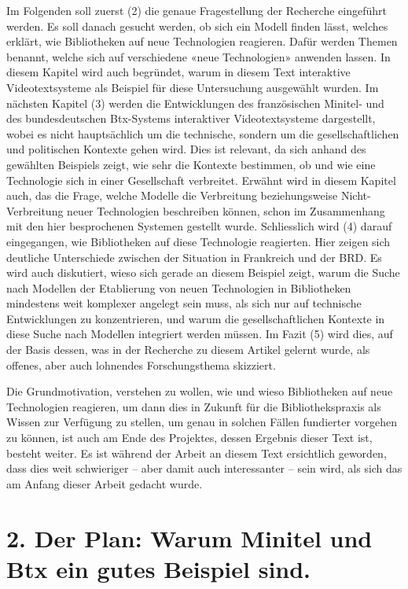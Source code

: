 \documentclass[a4paper,
fontsize=11pt,
oneside,
numbers=noperiodatend,
parskip=half-,
bibliography=totoc,
final
]{scrartcl}
\begin{document}
Im Folgenden soll zuerst (2) die genaue Fragestellung der Recherche
eingeführt werden. Es soll danach gesucht werden, ob sich ein Modell
finden lässt, welches erklärt, wie Bibliotheken auf neue Technologien
reagieren. Dafür werden Themen benannt, welche sich auf verschiedene
«neue Technologien» anwenden lassen. In diesem Kapitel wird auch
begründet, warum in diesem Text interaktive Videotextsysteme als
Beispiel für diese Untersuchung ausgewählt wurden. Im nächsten Kapitel
(3) werden die Entwicklungen des französischen Minitel- und des
bundesdeutschen Btx-Systems interaktiver Videotextsysteme dargestellt,
wobei es nicht hauptsächlich um die technische, sondern um die
gesellschaftlichen und politischen Kontexte gehen wird. Dies ist
relevant, da sich anhand des gewählten Beispiels zeigt, wie sehr die
Kontexte bestimmen, ob und wie eine Technologie sich in einer
Gesellschaft verbreitet. Erwähnt wird in diesem Kapitel auch, das die
Frage, welche Modelle die Verbreitung beziehungsweise Nicht-Verbreitung
neuer Technologien beschreiben können, schon im Zusammenhang mit den
hier besprochenen Systemen gestellt wurde. Schliesslich wird (4) darauf
eingegangen, wie Bibliotheken auf diese Technologie reagierten. Hier
zeigen sich deutliche Unterschiede zwischen der Situation in Frankreich
und der BRD. Es wird auch diskutiert, wieso sich gerade an diesem
Beispiel zeigt, warum die Suche nach Modellen der Etablierung von neuen
Technologien in Bibliotheken mindestens weit komplexer angelegt sein
muss, als sich nur auf technische Entwicklungen zu konzentrieren, und
warum die gesellschaftlichen Kontexte in diese Suche nach Modellen
integriert werden müssen. Im Fazit (5) wird dies, auf der Basis dessen,
was in der Recherche zu diesem Artikel gelernt wurde, als offenes, aber
auch lohnendes Forschungsthema skizziert.

Die Grundmotivation, verstehen zu wollen, wie und wieso Bibliotheken auf
neue Technologien reagieren, um dann dies in Zukunft für die
Bibliothekspraxis als Wissen zur Verfügung zu stellen, um genau in
solchen Fällen fundierter vorgehen zu können, ist auch am Ende des
Projektes, dessen Ergebnis dieser Text ist, besteht weiter. Es ist
während der Arbeit an diesem Text ersichtlich geworden, dass dies weit
schwieriger -- aber damit auch interessanter -- sein wird, als sich das
am Anfang dieser Arbeit gedacht wurde.

\hypertarget{der-plan-warum-minitel-und-btx-ein-gutes-beispiel-sind.}{%
\section{2. Der Plan: Warum Minitel und Btx ein gutes Beispiel
sind.}\label{der-plan-warum-minitel-und-btx-ein-gutes-beispiel-sind.}}
\end{document}
